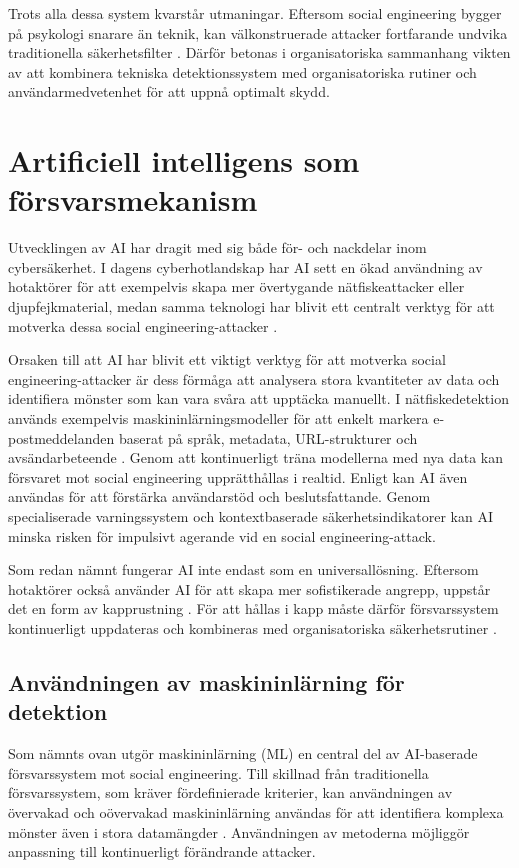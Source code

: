 Trots alla dessa system kvarstår utmaningar. Eftersom social engineering bygger på psykologi snarare än teknik, kan välkonstruerade attacker fortfarande undvika 
traditionella säkerhetsfilter \cite{algarni2019se_survey}. Därför betonas i organisatoriska sammanhang vikten av att kombinera tekniska detektionssystem med 
organisatoriska rutiner och användarmedvetenhet för att uppnå optimalt skydd.

\section{Artificiell intelligens som försvarsmekanism}
Utvecklingen av AI har dragit med sig både för- och nackdelar inom cybersäkerhet. I dagens cyberhotlandskap har AI sett en ökad användning av hotaktörer för att 
exempelvis skapa mer övertygande nätfiskeattacker eller djupfejkmaterial, medan samma teknologi har blivit ett centralt verktyg för att motverka dessa social 
engineering-attacker \cite{zhang2024digital_deception}.

Orsaken till att AI har blivit ett viktigt verktyg för att motverka social engineering-attacker är dess förmåga att analysera stora kvantiteter av data och identifiera mönster 
som kan vara svåra att upptäcka manuellt. I nätfiskedetektion används exempelvis maskininlärningsmodeller för att enkelt markera e-postmeddelanden baserat på språk, 
metadata, URL-strukturer och avsändarbeteende \cite{basnet2023anti_phishing}. Genom att kontinuerligt träna modellerna med nya data kan försvaret mot social engineering 
upprätthållas i realtid. Enligt \cite{zhang2024digital_deception, basnet2023anti_phishing} kan AI även användas för att förstärka användarstöd och beslutsfattande. Genom specialiserade varningssystem 
och kontextbaserade säkerhetsindikatorer kan AI minska risken för impulsivt agerande vid en social engineering-attack. 

Som redan nämnt fungerar AI inte endast som en universallösning. Eftersom hotaktörer också använder AI för att skapa mer sofistikerade angrepp, uppstår det en form av kapprustning \cite{zhang2024digital_deception}. 
För att hållas i kapp måste därför försvarssystem kontinuerligt uppdateras och kombineras med organisatoriska säkerhetsrutiner \cite{algarni2024comprehensive_taxonomy}.



\subsection{Användningen av maskininlärning för detektion}
Som nämnts ovan utgör maskininlärning (ML) en central del av AI-baserade försvarssystem mot social engineering. Till skillnad från traditionella försvarssystem, som kräver fördefinierade kriterier, 
kan användningen av övervakad och oövervakad maskininlärning användas för att identifiera komplexa mönster även i stora datamängder \cite{basnet2023anti_phishing}. 
Användningen av metoderna möjliggör anpassning till kontinuerligt förändrande attacker.

